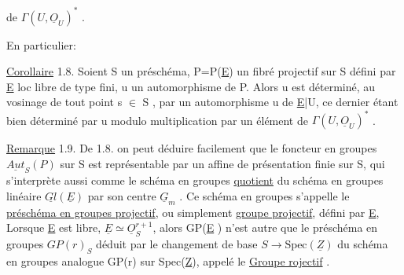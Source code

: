 
de $\Gamma(U,\underline{O}_U)^*$ .

En particulier:

\uline{Corollaire} 1.8. Soient S un préschéma, P=P(\underline{E}) un fibré projectif sur S
défini par \underline{E} loc libre de type fini, u un automorphisme de P. Alors u
est déterminé, au vosinage de tout point s $\in$ S , par un automorphisme
u de \underline{E}|U, ce dernier étant bien déterminé par u modulo multiplication par
un élément de $\Gamma(U,\underline{O}_U)^*$ .

\uline{Remarque} 1.9. De 1.8. on  peut déduire facilement que le foncteur 
 en groupes $\underline{Aut}_S(P)$ sur S est représentable par un  affine
de présentation finie sur S, qui s'interprète aussi comme le schéma en
groupes \uline{quotient} du schéma en groupes linéaire $\underline{Gl}(\underline{E})$ par son centre
$\underline{G}_m$ . Ce schéma en groupes s'appelle 
le \uline{préschéma en groupes projectif}, ou simplement \uline{groupe projectif}, défini
par \underline{E},  Lorsque \underline{E} est libre, $\underline{E}\simeq\underline{O}_S^{r+1}$, alors GP(\underline{E} ) n'est autre que le
 préschéma en groupes $GP(r)_S$ déduit par le changement de base
$S\to\mathrm{Spec}(\underline{Z})$  du schéma en groupes analogue GP(r) sur Spec(\underline{Z}), appelé
le \uline{Groupe rojectif} .


